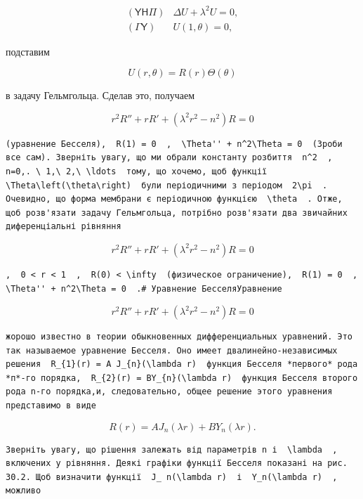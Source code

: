 \documentclass[
  ukrainian,
]{article}
\begin{document}
\[
\begin{array}{ll} (\mathsf{Y}\mathsf{H}\mathsf{\Pi}) & \Delta U + \lambda^2 U = 0, \\ (\mathsf{\Gamma}\mathsf{Y}) & U(1, \theta) = 0, \end{array}
\]

подставим

\[
U(r, \theta) = R(r) \Theta(\theta)
\]

в задачу Гельмгольца. Сделав это, получаем

\[
r^2R'' + rR' + (\lambda^2r^2 - n^2)R = 0
\]

\begin{verbatim}
(уравнение Бесселя),  R(1) = 0  ,  \Theta'' + n^2\Theta = 0  (Зроби все сам). Зверніть увагу, що ми обрали константу розбиття  n^2  ,  n=0,. \ 1,\ 2,\ \ldots  тому, що хочемо, щоб функції  \Theta\left(\theta\right)  були періодичними з періодом  2\pi  . Очевидно, що форма мембрани є періодичною функцією  \theta  . Отже, щоб розв'язати задачу Гельмгольца, потрібно розв'язати два звичайних диференціальні рівняння
\end{verbatim}

\[
r^2R'' + rR' + (\lambda^2r^2 - n^2) R = 0
\]

\begin{verbatim}
,  0 < r < 1  ,  R(0) < \infty  (физическое ограничение),  R(1) = 0  ,  \Theta'' + n^2\Theta = 0  .# Уравнение БесселяУравнение
\end{verbatim}

\[
r^2R'' + rR' + (\lambda^2r^2 - n^2)R = 0
\]

\begin{verbatim}
жорошо известно в теории обыкновенных дифференциальных уравнений. Это так называемое уравнение Бесселя. Оно имеет двалинейно-независимых решения  R_{1}(r) = A J_{n}(\lambda r)  функция Бесселя *первого* рода *п*-го порядка,  R_{2}(r) = BY_{n}(\lambda r)  функция Бесселя второго рода n-го порядка,и, следовательно, общее решение этого уравнения представимо в виде
\end{verbatim}

\[
R(r) = AJ_n(\lambda r) + BY_n(\lambda r).
\]

\begin{verbatim}
Зверніть увагу, що рішення залежать від параметрів n і  \lambda  , включених у рівняння. Деякі графіки функції Бесселя показані на рис. 30.2. Щоб визначити функції  J_ n(\lambda r)  і  Y_n(\lambda r)  , можливо
\end{verbatim}
\end{document}
